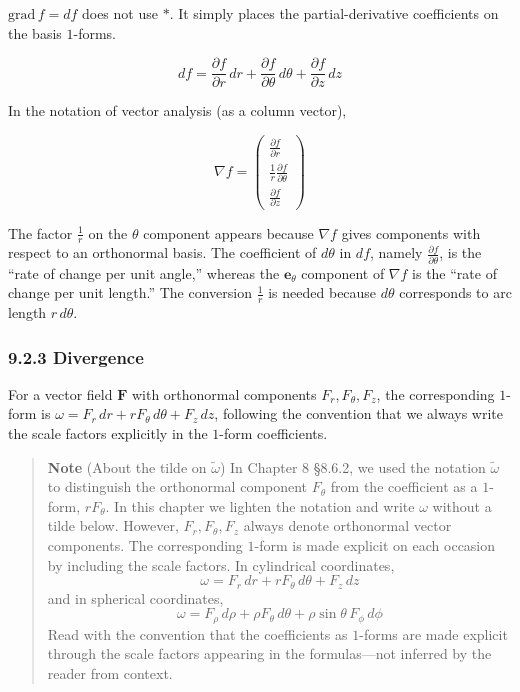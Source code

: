 \(\mathrm{grad}\,f = df\) does not use \(\ast\). It simply places the
partial-derivative coefficients on the basis \(1\)-forms.

\[df = \frac{\partial f}{\partial r}\,dr + \frac{\partial f}{\partial \theta}\,d\theta + \frac{\partial f}{\partial z}\,dz\]

In the notation of vector analysis (as a column vector),

\[
\nabla f
=
\begin{pmatrix}
\frac{\partial f}{\partial r}\\[0.4em]
\frac{1}{r}\frac{\partial f}{\partial \theta}\\[0.4em]
\frac{\partial f}{\partial z}
\end{pmatrix}
\]

The factor \(\frac{1}{r}\) on the \(\theta\) component appears because
\(\nabla f\) gives components with respect to an orthonormal basis. The
coefficient of \(d\theta\) in \(df\), namely
\(\frac{\partial f}{\partial\theta}\), is the ``rate of change per unit
angle,'' whereas the \(\mathbf{e}_\theta\) component of \(\nabla f\) is
the ``rate of change per unit length.'' The conversion \(\frac{1}{r}\)
is needed because \(d\theta\) corresponds to arc length \(r\,d\theta\).

\hypertarget{divergence-2}{%
\subsubsection{9.2.3 Divergence}\label{divergence-2}}

For a vector field \(\mathbf{F}\) with orthonormal components
\(F_r,F_\theta,F_z\), the corresponding \(1\)-form is
\(\omega = F_r\,dr + rF_\theta\,d\theta + F_z\,dz\), following the
convention that we always write the scale factors explicitly in the
\(1\)-form coefficients.

\begin{quote}
\textbf{Note} (About the tilde on \(\tilde{\omega}\)) In Chapter 8
§8.6.2, we used the notation \(\tilde{\omega}\) to distinguish the
orthonormal component \(F_\theta\) from the coefficient as a \(1\)-form,
\(rF_\theta\). In this chapter we lighten the notation and write
\(\omega\) without a tilde below. However, \(F_r,F_\theta,F_z\) always
denote orthonormal vector components. The corresponding \(1\)-form is
made explicit on each occasion by including the scale factors. In
cylindrical coordinates, \[
\omega = F_r\,dr + rF_\theta\,d\theta + F_z\,dz
\] and in spherical coordinates, \[
\omega = F_\rho\,d\rho + \rho F_\theta\,d\theta + \rho\sin\theta\,F_\phi\,d\phi
\] Read with the convention that the coefficients as \(1\)-forms are
made explicit through the scale factors appearing in the formulas---not
inferred by the reader from context.
\end{quote}


